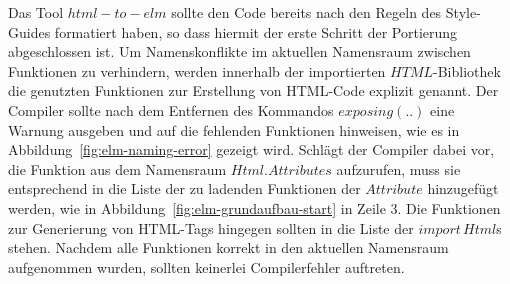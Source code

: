 Das Tool $html-to-elm$ sollte den Code bereits nach den Regeln des Style-Guides formatiert haben, so dass hiermit der erste Schritt der Portierung abgeschlossen ist. Um Namenskonflikte im aktuellen Namensraum zwischen Funktionen zu verhindern, werden innerhalb der importierten $HTML$-Bibliothek die genutzten Funktionen zur Erstellung von \ac{HTML}-Code explizit genannt. Der Compiler sollte nach dem Entfernen des Kommandos $exposing (..)$ eine Warnung ausgeben und auf die fehlenden Funktionen hinweisen, wie es in Abbildung~\ref{fig:elm-naming-error} gezeigt wird. Schlägt der Compiler dabei vor, die Funktion aus dem Namensraum $Html.Attributes$ aufzurufen, muss sie entsprechend in die Liste der zu ladenden Funktionen der $Attribute$ hinzugefügt werden, wie in Abbildung~\ref{fig:elm-grundaufbau-start} in Zeile 3. Die Funktionen zur Generierung von \ac{HTML}-Tags hingegen sollten in die Liste der $import\,Html$s stehen. Nachdem alle Funktionen korrekt in den aktuellen Namensraum aufgenommen wurden, sollten keinerlei Compilerfehler auftreten.


